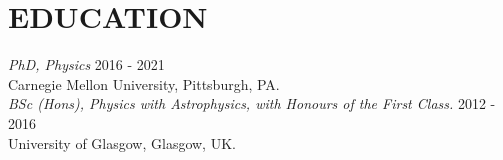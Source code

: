 
\section{EDUCATION}

{\sl PhD, Physics}  \hfill  2016 - 2021 \\
Carnegie Mellon University, Pittsburgh, PA. \\

{\sl BSc (Hons), Physics with Astrophysics, with Honours of the First Class.}  \hfill  2012 - 2016 \\
University of Glasgow, Glasgow, UK. \\

